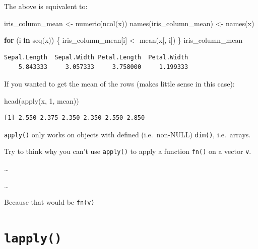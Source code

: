\documentclass[
]{book}
\makeatletter
\newenvironment{Shaded}{\begin{snugshade}}{\end{snugshade}}
\newcommand{\ControlFlowTok}[1]{\textcolor[rgb]{0.13,0.29,0.53}{\textbf{#1}}}
\newcommand{\DecValTok}[1]{\textcolor[rgb]{0.00,0.00,0.81}{#1}}
\newcommand{\FunctionTok}[1]{\textcolor[rgb]{0.00,0.00,0.00}{#1}}
\newcommand{\NormalTok}[1]{#1}
\newcommand{\OtherTok}[1]{\textcolor[rgb]{0.56,0.35,0.01}{#1}}
\newenvironment{kframe}{%
\medskip{}
\setlength{\fboxsep}{.8em}
 \def\at@end@of@kframe{}%
 \ifinner\ifhmode%
  \def\at@end@of@kframe{\end{minipage}}%
  \begin{minipage}{\columnwidth}%
 \fi\fi%
 \def\FrameCommand##1{\hskip\@totalleftmargin \hskip-\fboxsep
 \colorbox{shadecolor}{##1}\hskip-\fboxsep
     \hskip-\linewidth \hskip-\@totalleftmargin \hskip\columnwidth}%
 \MakeFramed {\advance\hsize-\width
   \@totalleftmargin\z@ \linewidth\hsize
   \@setminipage}}%
 {\par\unskip\endMakeFramed%
 \at@end@of@kframe}
\newenvironment{rmdblock}[1]
  {
  \begin{itemize}
  \renewcommand{\labelitemi}{
    \raisebox{-.7\height}[0pt][0pt]{
      {\setkeys{Gin}{width=3em,keepaspectratio}\texttt{[image: images/\#1]}}
    }
  }
  \setlength{\fboxsep}{1em}
  \begin{kframe}
  \item
  }
  {
  \end{kframe}
  \end{itemize}
  }
\newenvironment{note}
  {\begin{rmdblock}{note}}
  {\end{rmdblock}}
\makeatother
\begin{document}
The above is equivalent to:

\begin{Shaded}
\begin{Highlighting}[]
\NormalTok{iris\_column\_mean }\OtherTok{\textless{}{-}} \FunctionTok{numeric}\NormalTok{(}\FunctionTok{ncol}\NormalTok{(x))}
\FunctionTok{names}\NormalTok{(iris\_column\_mean) }\OtherTok{\textless{}{-}} \FunctionTok{names}\NormalTok{(x)}

\ControlFlowTok{for}\NormalTok{ (i }\ControlFlowTok{in} \FunctionTok{seq}\NormalTok{(x)) \{}
\NormalTok{  iris\_column\_mean[i] }\OtherTok{\textless{}{-}} \FunctionTok{mean}\NormalTok{(x[, i])}
\NormalTok{\}}
\NormalTok{iris\_column\_mean}
\end{Highlighting}
\end{Shaded}

\begin{verbatim}
Sepal.Length  Sepal.Width Petal.Length  Petal.Width 
    5.843333     3.057333     3.758000     1.199333 
\end{verbatim}

If you wanted to get the mean of the rows (makes little sense in this case):

\begin{Shaded}
\begin{Highlighting}[]
\FunctionTok{head}\NormalTok{(}\FunctionTok{apply}\NormalTok{(x, }\DecValTok{1}\NormalTok{, mean))}
\end{Highlighting}
\end{Shaded}

\begin{verbatim}
[1] 2.550 2.375 2.350 2.350 2.550 2.850
\end{verbatim}

\begin{note}
\texttt{apply()} only works on objects with defined (i.e.~non-NULL)
\texttt{dim()}, i.e.~arrays.
\end{note}

\begin{note}
Try to think why you can't use \texttt{apply()} to apply a function
\texttt{fn()} on a vector \texttt{v}.

\ldots{}

\ldots{}

Because that would be \texttt{fn(v)}
\end{note}

\hypertarget{lapply}{%
\section{\texorpdfstring{\texttt{lapply()}}{lapply()}}\label{lapply}}
\end{document}

